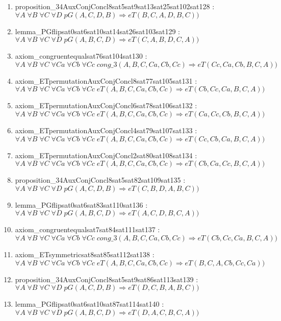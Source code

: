 \documentclass{article}
\begin{document}
\begin{enumerate}
\item proposition\_34AuxConjConcl8sat5sat9sat13sat25sat102sat128 : $\forall A\;\forall B\;\forall C\;\forall D\;pG(A, C, D, B) \Rightarrow eT(B, C, A, D, B, C))$
\item lemma\_PGflipsat0sat6sat10sat14sat26sat103sat129 : $\forall A\;\forall B\;\forall C\;\forall D\;pG(A, B, C, D) \Rightarrow eT(C, A, B, D, C, A))$
\item axiom\_congruentequalsat76sat104sat130 : $\forall A\;\forall B\;\forall C\;\forall Ca\;\forall Cb\;\forall Cc\;cong\_3(A, B, C, Ca, Cb, Cc) \Rightarrow eT(Cc, Ca, Cb, B, C, A))$
\item axiom\_ETpermutationAuxConjConcl8sat77sat105sat131 : $\forall A\;\forall B\;\forall C\;\forall Ca\;\forall Cb\;\forall Cc\;eT(A, B, C, Ca, Cb, Cc) \Rightarrow eT(Cb, Cc, Ca, B, C, A))$
\item axiom\_ETpermutationAuxConjConcl6sat78sat106sat132 : $\forall A\;\forall B\;\forall C\;\forall Ca\;\forall Cb\;\forall Cc\;eT(A, B, C, Ca, Cb, Cc) \Rightarrow eT(Ca, Cc, Cb, B, C, A))$
\item axiom\_ETpermutationAuxConjConcl4sat79sat107sat133 : $\forall A\;\forall B\;\forall C\;\forall Ca\;\forall Cb\;\forall Cc\;eT(A, B, C, Ca, Cb, Cc) \Rightarrow eT(Cc, Cb, Ca, B, C, A))$
\item axiom\_ETpermutationAuxConjConcl2sat80sat108sat134 : $\forall A\;\forall B\;\forall C\;\forall Ca\;\forall Cb\;\forall Cc\;eT(A, B, C, Ca, Cb, Cc) \Rightarrow eT(Cb, Ca, Cc, B, C, A))$
\item proposition\_34AuxConjConcl8sat5sat82sat109sat135 : $\forall A\;\forall B\;\forall C\;\forall D\;pG(A, C, D, B) \Rightarrow eT(C, B, D, A, B, C))$
\item lemma\_PGflipsat0sat6sat83sat110sat136 : $\forall A\;\forall B\;\forall C\;\forall D\;pG(A, B, C, D) \Rightarrow eT(A, C, D, B, C, A))$
\item axiom\_congruentequalsat7sat84sat111sat137 : $\forall A\;\forall B\;\forall C\;\forall Ca\;\forall Cb\;\forall Cc\;cong\_3(A, B, C, Ca, Cb, Cc) \Rightarrow eT(Cb, Cc, Ca, B, C, A))$
\item axiom\_ETsymmetricsat8sat85sat112sat138 : $\forall A\;\forall B\;\forall C\;\forall Ca\;\forall Cb\;\forall Cc\;eT(A, B, C, Ca, Cb, Cc) \Rightarrow eT(B, C, A, Cb, Cc, Ca))$
\item proposition\_34AuxConjConcl8sat5sat9sat86sat113sat139 : $\forall A\;\forall B\;\forall C\;\forall D\;pG(A, C, D, B) \Rightarrow eT(D, C, B, A, B, C))$
\item lemma\_PGflipsat0sat6sat10sat87sat114sat140 : $\forall A\;\forall B\;\forall C\;\forall D\;pG(A, B, C, D) \Rightarrow eT(D, A, C, B, C, A))$

\end{enumerate}
\end{document}
